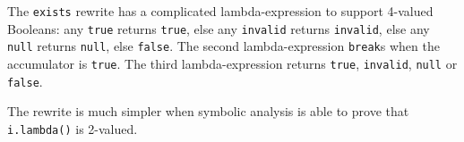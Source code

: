 \documentclass[
]{ceurart}
\begin{document}


The \verb!exists! rewrite has a complicated lambda-expression to support 4-valued Booleans: any \verb!true! returns \verb!true!, else any \verb!invalid! returns \verb!invalid!, else any \verb!null! returns \verb!null!, else \verb!false!. The second lambda-expression \verb!break!s when the accumulator is \verb!true!. The third lambda-expression returns \verb!true!, \verb!invalid!, \verb!null! or \verb!false!.

The rewrite is much simpler when symbolic analysis is able to prove that \verb!i.lambda()! is 2-valued.
\end{document}

